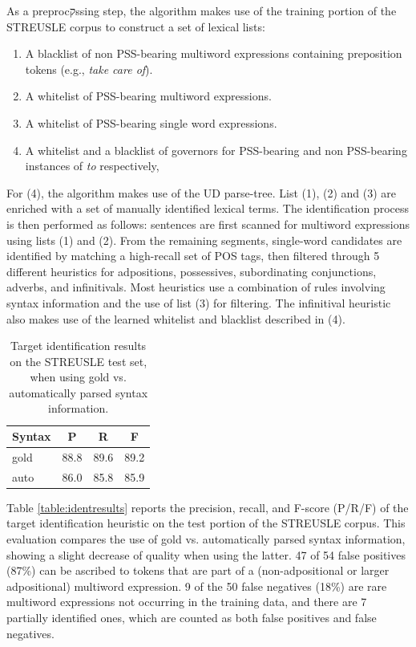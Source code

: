 As a preprocקssing step, the algorithm makes use of the training portion of the STREUSLE corpus to construct a set of lexical lists:
\begin{enumerate}
    \item A blacklist of non PSS-bearing multiword expressions containing preposition tokens (e.g., \emph{take care of}).
    \item A whitelist of PSS-bearing multiword expressions.
    \item A whitelist of PSS-bearing single word expressions.
    \item A whitelist and a blacklist of governors for PSS-bearing and non PSS-bearing instances of \emph{to} respectively, 
\end{enumerate}

For (4), the algorithm makes use of the UD parse-tree. List (1), (2) and (3) are enriched with a set of manually identified lexical terms. The identification process is then performed as follows: sentences are first scanned for multiword expressions using lists (1) and (2). From the remaining segments, single-word candidates are identified by matching a high-recall set of POS tags,
then filtered through 5 different heuristics for adpositions, possessives, subordinating conjunctions,
adverbs, and infinitivals. Most heuristics use a combination of rules involving syntax information and the use of list (3) for filtering. The infinitival heuristic also makes use of the learned whitelist and blacklist described in (4).

\begin{table}[t]\centering\small
\begin{tabular}{lccc}
Syntax & P & R & F \\
\toprule
gold & 88.8 & 89.6 & 89.2 \\
auto & 86.0 & 85.8 & 85.9 \\
\end{tabular}
\caption{Target identification results on the STREUSLE test set, when using gold vs. automatically parsed syntax information.}
\label{tab:targetid}
\end{table}

Table \ref{table:identresults}
reports the precision, recall, and F-score (P/R/F) of
the target identification heuristic on the test portion of the STREUSLE corpus. This evaluation compares the use of gold vs. automatically parsed syntax information, showing a slight decrease of quality when using the latter. 47 of 54 false positives (87\%) can be ascribed to tokens that are part of a (non-adpositional or larger adpositional) multiword expression. 9 of the 50 false negatives (18\%) are rare multiword expressions not
occurring in the training data, and there are 7 partially identified ones, which are counted as both
false positives and false negatives.

